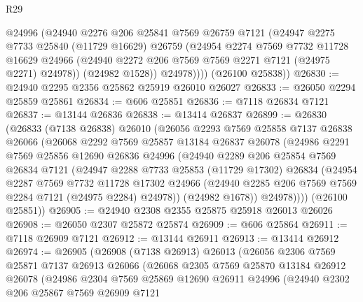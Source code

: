 \begin{lexlean}{R29}
\begin{coremodule}
            @24996
            (@24940
              @2276
              @206
              @25841
              @7569
              @26759
              @7121
              (@24947
                @2275
                @7733
                @25840
                (@11729 @16629)
                @26759
                (@24954
                  @2274
                  @7569
                  @7732
                  @11728
                  @16629
                  @24966
                  (@24940 @2272 @206 @7569 @7569 @2271 @7121 (@24975 @2271) @24978))
                (@24982 @1528))
              @24978))))
      (@26100 @25838))
@26830 := @24940 @2295 @2356 @25862 @25919 @26010 @26027
@26833 := @26050 @2294 @25859 @25861
@26834 := @606 @25851
@26836 := @7118 @26834 @7121
@26837 := @13144 @26836
@26838 := @13414 @26837
@26899 := @26830
    (@26833
      (@7138 @26838)
      @26010
      (@26056
        @2293
        @7569
        @25858
        @7137
        @26838
        @26066
        (@26068
          @2292
          @7569
          @25857
          @13184
          @26837
          @26078
          (@24986
            @2291
            @7569
            @25856
            @12690
            @26836
            @24996
            (@24940
              @2289
              @206
              @25854
              @7569
              @26834
              @7121
              (@24947
                @2288
                @7733
                @25853
                (@11729 @17302)
                @26834
                (@24954
                  @2287
                  @7569
                  @7732
                  @11728
                  @17302
                  @24966
                  (@24940 @2285 @206 @7569 @7569 @2284 @7121 (@24975 @2284) @24978))
                (@24982 @1678))
              @24978))))
      (@26100 @25851))
@26905 := @24940 @2308 @2355 @25875 @25918 @26013 @26026
@26908 := @26050 @2307 @25872 @25874
@26909 := @606 @25864
@26911 := @7118 @26909 @7121
@26912 := @13144 @26911
@26913 := @13414 @26912
@26974 := @26905
    (@26908
      (@7138 @26913)
      @26013
      (@26056
        @2306
        @7569
        @25871
        @7137
        @26913
        @26066
        (@26068
          @2305
          @7569
          @25870
          @13184
          @26912
          @26078
          (@24986
            @2304
            @7569
            @25869
            @12690
            @26911
            @24996
            (@24940
              @2302
              @206
              @25867
              @7569
              @26909
              @7121

\end{coremodule}
\end{lexlean}
